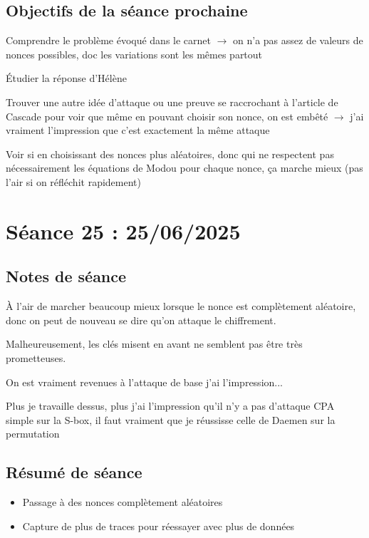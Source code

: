 \documentclass[12pt]{article}
\newcommand{\cmark}{\ding{51}}%
\newcommand{\done}{\rlap{$\square$}{\raisebox{2pt}{\large\hspace{1pt}\cmark}}%
	\hspace{-2.5pt}}
\begin{document}
	\subsection{Objectifs de la séance prochaine}
	\begin{todolist}
		\item[\done] Comprendre le problème évoqué dans le carnet $\rightarrow$ on n'a pas assez de valeurs de nonces possibles, doc les variations sont les mêmes partout
		\item \'Etudier la réponse d'Hélène 
		\item[\done] Trouver une autre idée d'attaque ou une preuve se raccrochant à l'article de Cascade pour voir que même en pouvant choisir son nonce, on est embêté $\rightarrow$ j'ai vraiment l'impression que c'est exactement la même attaque
		\item[\done] Voir si en choisissant des nonces plus aléatoires, donc qui ne respectent pas nécessairement les équations de Modou pour chaque nonce, ça marche mieux (pas l'air si on réfléchit rapidement)
	\end{todolist}
	
	
	\section{Séance 25 : 25/06/2025}
	\subsection{Notes de séance}
	À l'air de marcher beaucoup mieux lorsque le nonce est complètement aléatoire, donc on peut de nouveau se dire qu'on attaque le chiffrement.
	
	\noindent Malheureusement, les clés misent en avant ne semblent pas être très prometteuses.
	
	\noindent On est vraiment revenues à l'attaque de base j'ai l'impression...
	
	\noindent Plus je travaille dessus, plus j'ai l'impression qu'il n'y a pas d'attaque CPA simple sur la S-box, il faut vraiment que je réussisse celle de Daemen sur la permutation
	
	\subsection{Résumé de séance}
	\begin{itemize}
		\item Passage à des nonces complètement aléatoires
		\item Capture de plus de traces pour réessayer avec plus de données
	\end{itemize}
	
\end{document}
